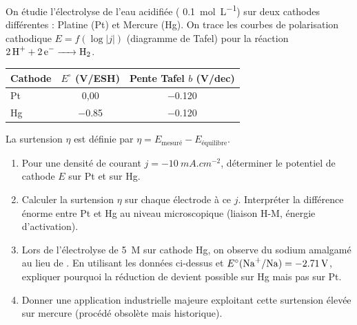 \documentclass[11pt]{article}
\begin{document}
\begin{exercice}
On étudie l'électrolyse de l'eau acidifiée ( \SI{0,1}{mol.L^{-1}}) sur deux cathodes différentes : Platine (Pt) et Mercure (Hg). On trace les courbes de polarisation cathodique $E = f(\log|j|)$ (diagramme de Tafel) pour la réaction $\ce{2H+ + 2e- -> H2}$.
\begin{center}
\begin{tabular}{lcc}
\hline
Cathode & $E^\circ$ (V/ESH) & Pente Tafel $b$ (V/dec) \\
\hline
Pt & 0,00 & \SI{-0,120}{} \\
Hg & \SI{-0,85}{} & \SI{-0,120}{} \\
\hline
\end{tabular}
\end{center}
La surtension $\eta$ est définie par $\eta = E_{\text{mesuré}} - E_{\text{équilibre}}$.
\begin{enumerate}
    \item Pour une densité de courant $j = \SI{-10}{mA.cm^{-2}}$, déterminer le potentiel de cathode $E$ sur Pt et sur Hg.
    \item Calculer la surtension $\eta$ sur chaque électrode à ce $j$. Interpréter la différence énorme entre Pt et Hg au niveau microscopique (liaison H-M, énergie d'activation).
    \item Lors de l'électrolyse de  \SI{5}{M} sur cathode Hg, on observe du sodium amalgamé au lieu de . En utilisant les données ci-dessus et $E^\circ(\ce{Na+/Na}) = \SI{-2,71}{V}$, expliquer pourquoi la réduction de  devient possible sur Hg mais pas sur Pt.
    \item Donner une application industrielle majeure exploitant cette surtension élevée sur mercure (procédé obsolète mais historique).
\end{enumerate}
\end{exercice}
\end{document}
